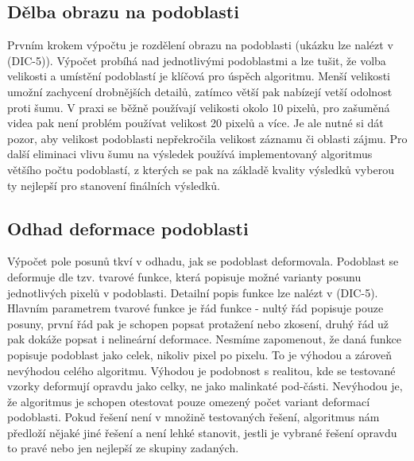 \documentclass[a4paper,12pt]{article}
\begin{document}
\subsection{Dělba obrazu na podoblasti}
Prvním krokem výpočtu je rozdělení obrazu na podoblasti (ukázku lze nalézt v (DIC-5)). Výpočet probíhá nad jednotlivými podoblastmi a lze tušit, že volba velikosti a umístění podoblastí je klíčová pro úspěch algoritmu. Menší velikosti umožní zachycení drobnějších detailů, zatímco větší pak nabízejí vetší odolnost proti šumu. V praxi se běžně používají velikosti okolo 10 pixelů, pro zašuměná videa pak není problém používat velikost 20 pixelů a více. Je ale nutné si dát pozor, aby velikost podoblasti nepřekročila velikost záznamu či oblasti zájmu. Pro další eliminaci vlivu šumu na výsledek používá implementovaný algoritmus většího počtu podoblastí, z kterých se pak na základě kvality výsledků vyberou ty nejlepší pro stanovení finálních výsledků.
\subsection{Odhad deformace podoblasti}
Výpočet pole posunů tkví v odhadu, jak se podoblast deformovala. Podoblast se deformuje dle tzv. tvarové funkce, která popisuje možné varianty posunu jednotlivých pixelů v podoblasti. Detailní popis funkce lze nalézt v (DIC-5). Hlavním parametrem tvarové funkce je řád funkce - nultý řád popisuje pouze posuny, první řád pak je schopen popsat protažení nebo zkosení, druhý řád už pak dokáže popsat i nelineární deformace. Nesmíme zapomenout, že daná funkce popisuje podoblast jako celek, nikoliv pixel po pixelu. To je výhodou a zároveň nevýhodou celého algoritmu. Výhodou je podobnost s realitou, kde se testované vzorky deformují opravdu jako celky, ne jako malinkaté pod-části. Nevýhodou je, že algoritmus je schopen otestovat pouze omezený počet variant deformací podoblasti. Pokud řešení není v množině testovaných řešení, algoritmus nám předloží nějaké jiné řešení a není lehké stanovit, jestli je vybrané řešení opravdu to pravé nebo jen nejlepší ze skupiny zadaných.
\end{document}
